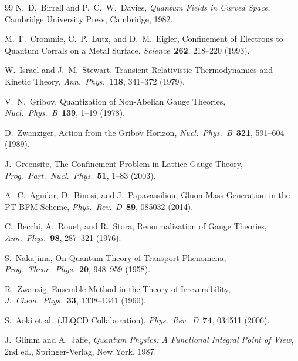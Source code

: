 \documentclass[12pt,a4paper]{article}
\theoremstyle{definition}
\begin{document}
\begin{thebibliography}{99}
  N.~D.~Birrell and P.~C.~W.~Davies,
  \textit{Quantum Fields in Curved Space},
  Cambridge University Press, Cambridge, 1982.

  M.~F.~Crommie, C.~P.~Lutz, and D.~M.~Eigler,
  Confinement of Electrons to Quantum Corrals on a Metal Surface,
  \textit{Science}\ \textbf{262}, 218--220 (1993).

  W.~Israel and J.~M.~Stewart,
  Transient Relativistic Thermodynamics and Kinetic Theory,
  \textit{Ann.\ Phys.}\ \textbf{118}, 341--372 (1979).

  V.~N.~Gribov,
  Quantization of Non-Abelian Gauge Theories,
  \textit{Nucl.\ Phys.\ B}\ \textbf{139}, 1--19 (1978).

  D.~Zwanziger,
  Action from the Gribov Horizon,
  \textit{Nucl.\ Phys.\ B}\ \textbf{321}, 591--604 (1989).

  J.~Greensite,
  The Confinement Problem in Lattice Gauge Theory,
  \textit{Prog.\ Part.\ Nucl.\ Phys.}\ \textbf{51}, 1--83 (2003).

  A.~C.~Aguilar, D.~Binosi, and J.~Papavassiliou,
  Gluon Mass Generation in the PT-BFM Scheme,
  \textit{Phys.\ Rev.\ D}\ \textbf{89}, 085032 (2014).

  C.~Becchi, A.~Rouet, and R.~Stora,
  Renormalization of Gauge Theories,
  \textit{Ann.\ Phys.}\ \textbf{98}, 287--321 (1976).

  S.~Nakajima,
  On Quantum Theory of Transport Phenomena,
  \textit{Prog.\ Theor.\ Phys.}\ \textbf{20}, 948--959 (1958).

  R.~Zwanzig,
  Ensemble Method in the Theory of Irreversibility,
  \textit{J.\ Chem.\ Phys.}\ \textbf{33}, 1338--1341 (1960).

  S.~Aoki et al.\ (JLQCD Collaboration),
  \textit{Phys.\ Rev.\ D}\ \textbf{74}, 034511 (2006).

  J.~Glimm and A.~Jaffe,
  \textit{Quantum Physics: A Functional Integral Point of View},
  2nd ed., Springer-Verlag, New York, 1987.

\end{thebibliography}
\end{document}
